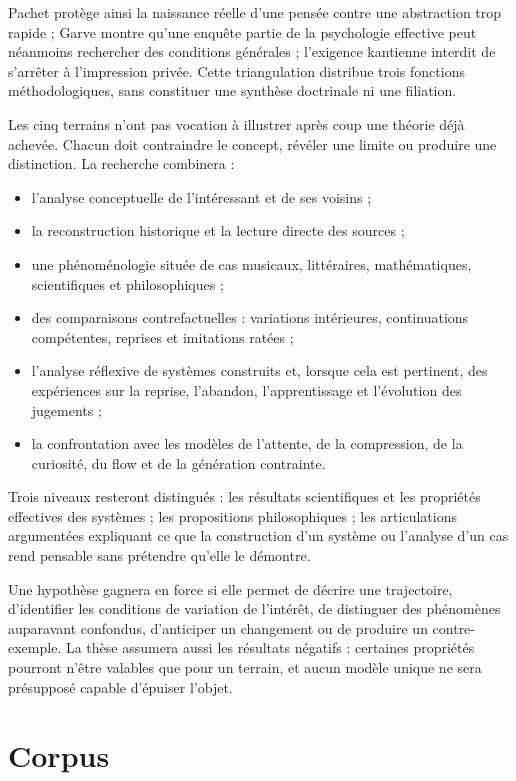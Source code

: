 \documentclass[11pt,a4paper]{article}
\begin{document}
Pachet protège ainsi la naissance réelle d'une pensée contre une abstraction trop
rapide ; Garve montre qu'une enquête partie de la psychologie effective peut
néanmoins rechercher des conditions générales ; l'exigence kantienne interdit de
s'arrêter à l'impression privée. Cette triangulation distribue trois fonctions
méthodologiques, sans constituer une synthèse doctrinale ni une filiation.

Les cinq terrains n'ont pas vocation à illustrer après coup une théorie déjà
achevée. Chacun doit contraindre le concept, révéler une limite ou produire une
distinction. La recherche combinera :

\begin{itemize}
  \item l'analyse conceptuelle de l'intéressant et de ses voisins ;
  \item la reconstruction historique et la lecture directe des sources ;
  \item une phénoménologie située de cas musicaux, littéraires, mathématiques,
        scientifiques et philosophiques ;
  \item des comparaisons contrefactuelles : variations intérieures,
        continuations compétentes, reprises et imitations ratées ;
  \item l'analyse réflexive de systèmes construits et, lorsque cela est
        pertinent, des expériences sur la reprise, l'abandon, l'apprentissage
        et l'évolution des jugements ;
  \item la confrontation avec les modèles de l'attente, de la compression, de
        la curiosité, du flow et de la génération contrainte.
\end{itemize}

Trois niveaux resteront distingués : les résultats scientifiques et les
propriétés effectives des systèmes ; les propositions philosophiques ; les
articulations argumentées expliquant ce que la construction d'un système ou
l'analyse d'un cas rend pensable sans prétendre qu'elle le démontre.

Une hypothèse gagnera en force si elle permet de décrire une trajectoire,
d'identifier les conditions de variation de l'intérêt, de distinguer des
phénomènes auparavant confondus, d'anticiper un changement ou de produire un
contre-exemple. La thèse assumera aussi les résultats négatifs : certaines
propriétés pourront n'être valables que pour un terrain, et aucun modèle unique
ne sera présupposé capable d'épuiser l'objet.

\section{Corpus}
\end{document}
